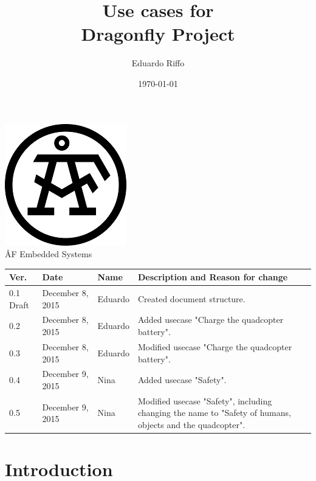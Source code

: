 \documentclass[a4paper]{article}
\title{ Use cases for\\ Dragonfly Project}
\author{Eduardo Riffo}
\date{\today}         		%
\begin{document}

\maketitle                      	%

\begin{center}
\vspace{64pt}
\includegraphics[scale=1.6]{images/AF_Logotype20141_Black.png}
\vspace{16pt}
\\ \large ÅF Embedded Systems
\end{center}

\vspace{16pt}
\begin{tabular}{ l l l p{8.5cm} }
	Ver. & Date & Name & Description and Reason for change \\\hline
	0.1 Draft & December 8, 2015 & Eduardo & Created document structure.\\
	0.2  & December 8, 2015 & Eduardo & Added usecase "Charge the quadcopter battery".\\
	0.3  & December 8, 2015 & Eduardo & Modified usecase "Charge the quadcopter battery".\\
	0.4	& December 9, 2015	& Nina	& Added usecase "Safety".\\
	0.5	& December 9, 2015	& Nina	& Modified usecase "Safety", including changing the name to "Safety of humans, objects and the quadcopter".\\
\end{tabular}

\newpage

\tableofcontents					%

\newpage

\section{Introduction}
\end{document}

